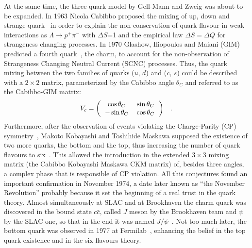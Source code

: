 At the same time, the three-quark model by Gell-Mann and Zweig was about to 
be expanded. In 1963 Nicola Cabibbo proposed the mixing of up, down and 
strange quark~\cite{PhysRevLett.10.531} 
in order to explain the non-conservation of quark flavour 
in weak interactions as $\Lambda \rightarrow p^{+}\pi^{-}$ with $\Delta S$=1 
and the empirical law $\Delta S = \Delta Q$ for strangeness changing processes. 
In 1970 Glashow, Iliopoulos and Maiani (GIM) predicted a fourth quark~\cite{PhysRevD.2.1285}, 
the charm, to account for the non-observation of Strangeness Changing Neutral 
Current (SCNC) processes. Thus, the quark mixing between the two families
of quarks ($u$, $d$) and ($c$, $s$) could be described with a $2\times 2$ 
matrix, parameterized by the Cabibbo angle $\theta_{C}$ and referred to as
 the Cabibbo-GIM matrix:
\begin{equation}\label{CabibboGIM}
V_{c} = {\setlength\arraycolsep{6pt}
\left( \begin{array}{cc}
\cos\theta_{C} & \sin\theta_{C}\\
-\sin\theta_{C}& \cos\theta_{C}
\end{array}
\right)} \quad .
\end{equation}
Furthermore, after the observation of events violating the Charge-Parity (CP) 
symmetry~\cite{PhysRevLett.13.286}, Makoto Kobayashi and 
Toshihide Maskawa supposed the 
existence of two more quarks, the bottom and the top, thus increasing 
the number of quark flavours to six~\cite{Kobayashi:1973fv}. 
This allowed the introduction in 
the extended $3\times 3$ mixing matrix (the Cabibbo Kobayashi Maskawa CKM matrix) 
of, besides three angles, a complex phase that is responsible of CP violation. 
All this conjectures found an important confirmation in November 1974, a date
later known as ``the November Revolution'' probably because it set the 
beginning of a real trust in the quark theory. 
Almost simultaneously at SLAC and at Brookhaven the charm quark was discovered 
in the bound state $c\bar c$, called $J$ meson by the Brookhaven team and 
$\psi$ by the SLAC one, so that in the end it was named $J/\psi$~\cite{PhysRevLett.33.1404,PhysRevLett.33.1406}. 
Not too much later, the bottom quark was observed in 1977 at 
Fermilab~\cite{PhysRevLett.39.252}, 
enhancing the belief in the top quark existence and in the six flavours theory.

